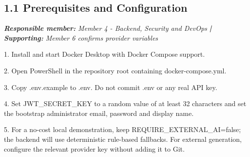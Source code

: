 \documentclass[11pt,a4paper]{article}
\begin{document}
\subsection*{1.1 Prerequisites and Configuration}


\noindent\textit{\textbf{Responsible member: }Member 4 - Backend, Security and DevOps\textbf{ | Supporting: }Member 6 confirms provider variables}\par

1.  Install and start Docker Desktop with Docker Compose support.\par

2.  Open PowerShell in the repository root containing docker-compose.yml.\par

3.  Copy .env.example to .env. Do not commit .env or any real API key.\par

4.  Set JWT\_SECRET\_KEY to a random value of at least 32 characters and set the bootstrap administrator email, password and display name.\par

5.  For a no-cost local demonstration, keep REQUIRE\_EXTERNAL\_AI=false; the backend will use deterministic rule-based fallbacks. For external generation, configure the relevant provider key without adding it to Git.\par
\end{document}
